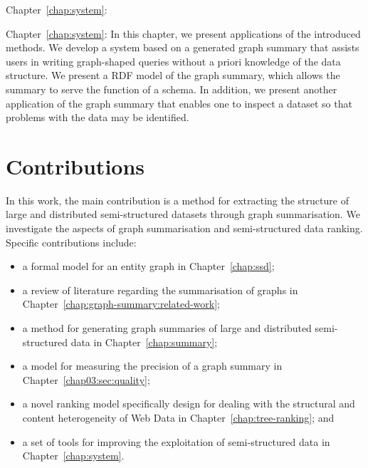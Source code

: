 
\begin{labeling}{Chapter~\ref{chap:system}:}
\item[Chapter~\ref{chap:system}:] In this chapter, we present applications of the introduced methods. We develop a system based on a generated graph summary that assists users in writing graph-shaped queries without a priori knowledge of the data structure. We present a RDF model of the graph summary, which allows the summary to serve the function of a schema. In addition, we present another application of the graph summary that enables one to inspect a dataset so that problems with the data may be identified.
\end{labeling}

\section{Contributions}

In this work, the main contribution is a method for extracting the structure of large and distributed semi-structured datasets through graph summarisation.
We investigate the aspects of graph summarisation and semi-structured data ranking. Specific contributions include:

\begin{itemize}
	\item a formal model for an entity graph in Chapter~\ref{chap:ssd};
	\item a review of literature regarding the summarisation of graphs in Chapter~\ref{chap:graph-summary:related-work};
	\item a method for generating graph summaries of large and distributed semi-structured data in Chapter~\ref{chap:summary};
	\item a model for measuring the precision of a graph summary in Chapter~\ref{chap03:sec:quality};
	\item a novel ranking model specifically design for dealing with the structural and content heterogeneity of Web Data in Chapter~\ref{chap:tree-ranking}; and
	\item a set of tools for improving the exploitation of semi-structured data in Chapter~\ref{chap:system}.
\end{itemize}
